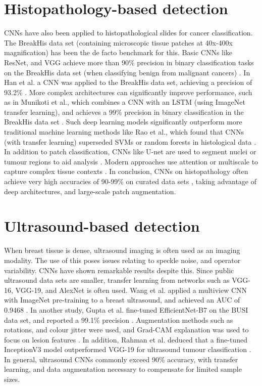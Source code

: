 \documentclass[../main]{subfiles}
\begin{document}
\section{Histopathology-based detection}
\label{sec:histopathology-cnn}
CNNs have also been applied to histopathological slides for cancer classification. The BreakHis data set (containing microscopic tissue patches at 40x-400x magnification) has been the de facto benchmark for this. Basic CNNs like ResNet, and VGG achieve more than 90\% precision in binary classification tasks on the BreakHis data set (when classifying benign from malignant cancers) \autocite{jiang2024deep}. In Han et al. a CNN was applied to the BreakHis data set, achieving a precision of 93.2\% \autocite{jiang2024deep}. More complex architectures can significantly improve performance, such as in Munikoti et al., which combines a CNN with an LSTM (using ImageNet transfer learning), and achieves a 99\% precision in binary classification in the BreakHis data set \autocite{srikantamurthy2023classification}. Such deep learning models significantly outperform more traditional machine learning methods like Rao et al., which found that CNNs (with transfer learning) superseded SVMs or random forests in histological data \autocite{yusoff2023accuracy}. In addition to patch classification, CNNs like U-net are used to segment nuclei or tumour regions to aid analysis \autocite{jiang2024deep}. Modern approaches use attention or multiscale to capture complex tissue contexts \autocite{srikantamurthy2023classification}. In conclusion, CNNs on histopathology often achieve very high accuracies of 90-99\% on curated data sets \autocite{srikantamurthy2023classification} \autocite{yusoff2023accuracy}, taking advantage of deep architectures, and large-scale patch augmentation.

\section{Ultrasound-based detection}
\label{sec:ultrasound-cnn}
When breast tissue is dense, ultrasound imaging is often used as an imaging modality. The use of this poses issues relating to speckle noise, and operator variability. CNNs have shown remarkable results despite this. Since public ultrasound data sets are smaller, transfer learning from networks such as VGG-16, VGG-19, and AlexNet is often used. Wang et al. applied a multiview CNN with ImageNet pre-training to a breast ultrasound, and achieved an AUC of 0.9468 \autocite{wang2024mammography}. In another study, Gupta et al. fine-tuned EfficientNet-B7 on the BUSI data set, and reported a 99.1\% precision \autocite{latha2024revolutionizing}. Augmentation methods such as rotations, and colour jitter were used, and Grad-CAM explanation was used to focus on lesion features \autocite{latha2024revolutionizing}. In addition, Rahman et al. deduced that a fine-tuned InceptionV3 model outperformed VGG-19 for ultrasound tumour classification \autocite{ayana2021transfer}. In general, ultrasound CNNs commonly exceed 90\% accuracy, with transfer learning, and data augmentation necessary to compensate for limited sample sizes.
\end{document}
